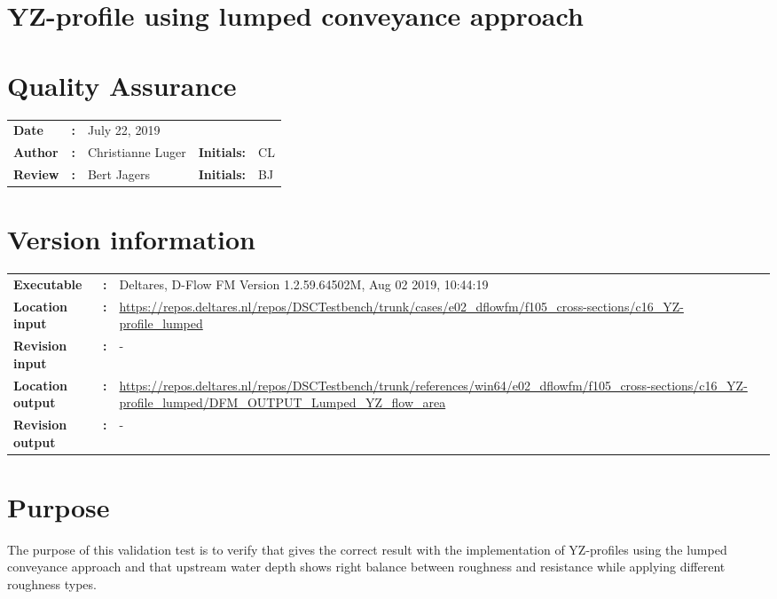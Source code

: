 

\section{YZ-profile using lumped conveyance approach}
\newrefsegment

\section*{Quality Assurance}
\begin{tabular}{@{}p{27mm}@{}p{0mm}p{\textwidth-52mm-48pt}p{15mm}p{10mm}}
\textbf{Date} & \textbf{:} &   July 22, 2019\\
\textbf{Author} & \textbf{:} & Christianne Luger & \textbf{Initials: } & CL \\
\textbf{Review} & \textbf{:} &  Bert Jagers & \textbf{Initials:} & BJ 
\end{tabular}

\section*{Version information}
{{
\begin{tabular}{@{}p{27mm}@{}p{0mm}p{\textwidth-27mm-24pt}}
\textbf{Executable}   & \textbf{:} & Deltares, D-Flow FM Version 1.2.59.64502M, Aug 02 2019, 10:44:19  \\
\textbf{Location input}     & \textbf{:} & \url{https://repos.deltares.nl/repos/DSCTestbench/trunk/cases/e02_dflowfm/f105_cross-sections/c16_YZ-profile_lumped}  \\
\textbf{Revision input} & \textbf{:} & - \\
\textbf{Location output}     & \textbf{:} & \url{https://repos.deltares.nl/repos/DSCTestbench/trunk/references/win64/e02_dflowfm/f105_cross-sections/c16_YZ-profile_lumped/DFM_OUTPUT_Lumped_YZ_flow_area} \\
\textbf{Revision output} & \textbf{:} & -
\end{tabular}
}}

\section*{Purpose}
The purpose of this validation test is to verify that \dflowfm gives the correct result with the implementation of YZ-profiles using the lumped conveyance approach and that upstream water depth shows right balance between roughness and resistance while applying different roughness types.

